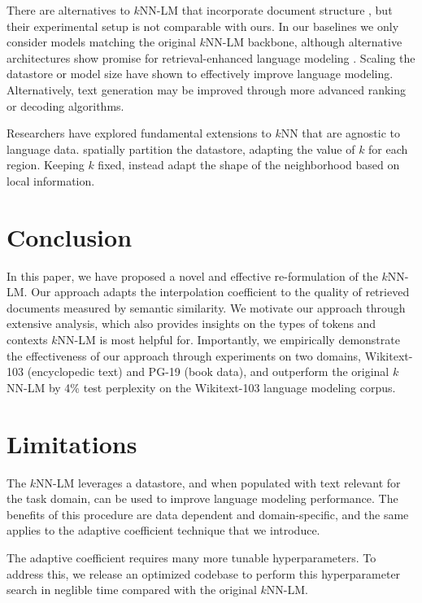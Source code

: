 \documentclass[11pt]{article}
\begin{document}
There are alternatives to $k$NN-LM that incorporate document structure \cite{Xu2021CapturingSL}, but their experimental setup is not comparable with ours. In our baselines we only consider models matching the original $k$NN-LM backbone, although alternative architectures show promise for retrieval-enhanced language modeling \cite{Yogatama2021AdaptiveSL,meng2022gnnlm,zhong2022training}. Scaling the datastore \cite{Borgeaud2021ImprovingLM} or model size \cite{Shoeybi2019MegatronLMTM} have shown to effectively improve language modeling. Alternatively, text generation may be improved through more advanced ranking \cite{min-etal-2021-joint} or decoding \cite{rankgen22} algorithms.


Researchers have explored fundamental extensions to $k$NN that are agnostic to language data. \citet{locallyadaptive1993} spatially partition the datastore, adapting the value of $k$ for each region. Keeping $k$ fixed, \citet{discadapt1995knn} instead adapt the shape of the neighborhood based on local information. 

\section{Conclusion}

In this paper, we have  proposed a novel and effective re-formulation of the $k$NN-LM. Our approach adapts the interpolation coefficient to the quality of retrieved documents measured by semantic similarity. We motivate our approach through extensive analysis, which also provides insights on the types of tokens and contexts $k$NN-LM is most helpful for. Importantly, we empirically demonstrate the effectiveness of our approach through experiments on two domains, Wikitext-103 (encyclopedic text) and PG-19 (book data), and outperform the original $k$NN-LM by 4\% test perplexity on the Wikitext-103 language modeling corpus.

\section*{Limitations}

The $k$NN-LM leverages a datastore, and when populated with text relevant for the task domain, can be used to improve language modeling performance. The benefits of this procedure are data dependent and domain-specific, and the same applies to the adaptive coefficient technique that we introduce.

The adaptive coefficient requires many more tunable hyperparameters. To address this, we release an optimized codebase to perform this hyperparameter search in neglible time compared with the original $k$NN-LM.
\end{document}
